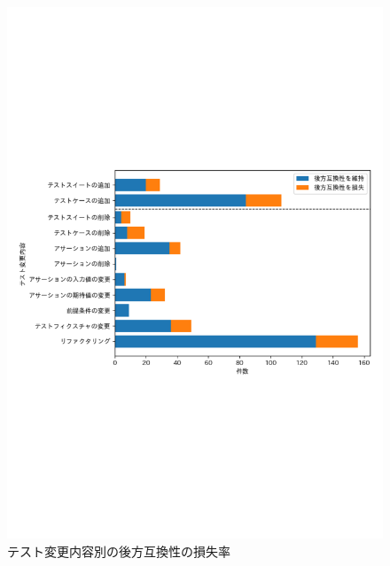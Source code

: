 \documentclass[submit]{ipsj}
\begin{document}

\begin{figure}[t]
  \centering
  \includegraphics[width=1.0\linewidth]{IPSJjournal_maekawa_fig/barh-test-pattern.pdf}
  \caption{テスト変更内容別の後方互換性の損失率}
  \label{fig:test_pattern}
  \vspace{-4mm}
\end{figure}
\end{document}
